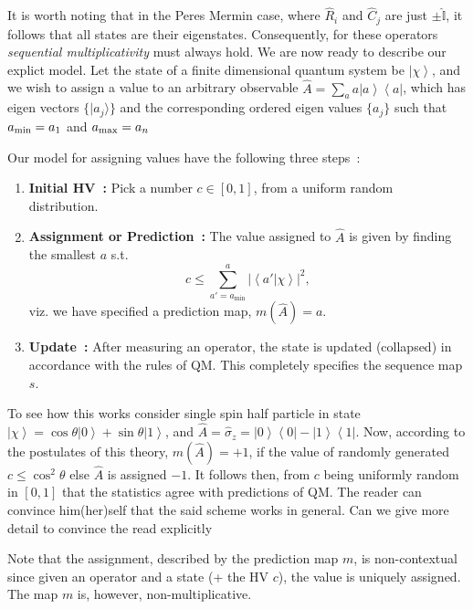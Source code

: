 \documentclass[british,aps,prl,superscriptaddress,nofootinbib,times,reprint]{revtex4-1}
\theoremstyle{plain}
\theoremstyle{definition}
\theoremstyle{remark}
\theoremstyle{plain}
\theoremstyle{plain}
\theoremstyle{plain}
\theoremstyle{definition}
\theoremstyle{definition}
\begin{document}
It is worth noting that in the Peres Mermin
case, where $\hat{R}_{i}$ and $\hat{C}_{j}$ are
just $\pm\hat{\mathbb{I}}$, it follows that all
states are their eigenstates. Consequently, for
these operators \emph{sequential multiplicativity}
must always hold.
We are now ready to describe our explict model.
Let the state of a finite dimensional quantum system
be $\left|\chi\right\rangle $, and we wish to
assign a value to an arbitrary observable 
$\hat{A}=\sum_{a}a\left|a\right\rangle
\left\langle a\right|$, which has 
eigen vectors $\{ \vert
a_j\rangle \}$ and the corresponding ordered eigen
values $\{a_j\}$ such that 
$a_{\rm min}=a_1$
and 
$a_{\rm max}=a_n$

Our model for assigning values have the following
three steps~:
\begin{enumerate}
\item
{\bf Initial HV~:} Pick a number
$c\in[0,1]$, from a uniform random distribution.\
\item
{\bf  
Assignment or Prediction~:}
 The value assigned to
$\hat{A}$ is given by finding the smallest $a$
s.t.  \[
c\le\sum_{a'=a_{\text{min}}}^{a}\left|\left\langle
a'|\chi\right\rangle \right|^{2}, \] viz. we have
specified a prediction map, $m(\hat{A})=a$.
\item
{\bf Update~:} After measuring an operator, the state is
updated (collapsed) in accordance with the rules
of QM. This completely specifies the sequence map
$s$.
\end{enumerate}
To see how this works consider 
single spin half particle in state
$\left|\chi\right\rangle
=\cos\theta\left|0\right\rangle
+\sin\theta\left|1\right\rangle $, and
$\hat{A}=\hat{\sigma}_{z}=\left|0\right\rangle
\left\langle 0\right|-\left|1\right\rangle
\left\langle 1\right|$. Now, according to the
postulates of this theory, $m(\hat{A})=+1$, if
the value of randomly generated 
$c\le\cos^{2}\theta$ else $\hat{A}$ is assigned
$-1$. It follows then, from $c$ being uniformly
random in $[0,1]$ that the statistics agree with
predictions of QM. The reader can convince
him(her)self that the said scheme works in
general. {\color{red} Can we give more detail to
convince the read explicitly}

Note that the assignment, described by the
prediction map $m$, is non-contextual since given
an operator and a state (+ the HV $c$), the value is
uniquely assigned. The map $m$ is, however,
non-multiplicative. 
\end{document}
